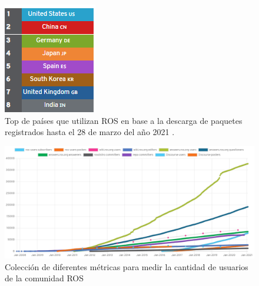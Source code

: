         \begin{figure}[htb]
            \centering
            \includegraphics[width=0.27\linewidth]{Main/Chapter3/Images3/cap3_estadisticas_7.png}
            \caption{Top de países que utilizan ROS en base a la descarga de paquetes registrados hasta el 28 de marzo del año 2021 \cite{rosmetrics}.}
            \label{f:Cap3-5_estadisticas_4}
        \end{figure}  
        

        \begin{figure}[htb]
            \centering
            \includegraphics[width=1.0\linewidth]{Main/Chapter3/Images3/cap3_estadisticas_4.png}
            \caption{Colección de diferentes métricas para medir la cantidad de usuarios de la comunidad ROS \cite{rosmetrics}}
            \label{f:Cap3-5_estadisticas_5}
        \end{figure}  
        
        \newpage

